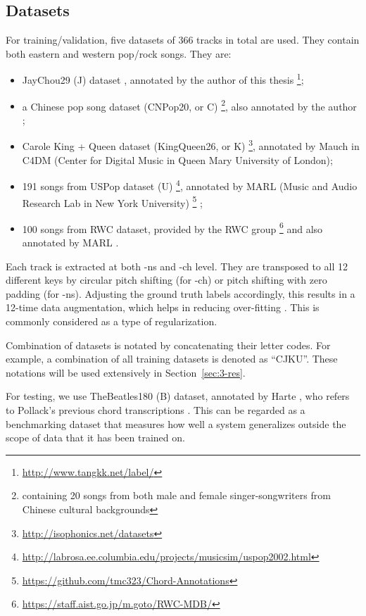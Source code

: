 \subsection{Datasets}
For training/validation, five datasets of 366 tracks in total are used. They contain both eastern and western pop/rock songs. They are:
\begin{itemize}
\item JayChou29 (J) dataset \cite{deng2016chord}, annotated by the author of this thesis \footnote{\url{http://www.tangkk.net/label/}};
\item a Chinese pop song dataset (CNPop20, or C) \footnote{containing 20 songs from both male and female singer-songwriters from Chinese cultural backgrounds}, also annotated by the author \cite{deng2016hybrid};
\item Carole King + Queen dataset (KingQueen26, or K) \footnote{\url{http://isophonics.net/datasets}}, annotated by Mauch \cite{mauch2009omras2} in C4DM (Center for Digital Music in Queen Mary University of London);
\item 191 songs from USPop dataset (U) \footnote{\url{http://labrosa.ee.columbia.edu/projects/musicsim/uspop2002.html}}, annotated by MARL (Music and Audio Research Lab in New York University) \footnote{\url{https://github.com/tmc323/Chord-Annotations}} \cite{cho2014improved};
\item 100 songs from RWC dataset, provided by the RWC group \footnote{\url{https://staff.aist.go.jp/m.goto/RWC-MDB/}} and also annotated by MARL \cite{cho2014improved}.
\end{itemize}


Each track is extracted at both -ns and -ch level. They are transposed to all 12 different keys by circular pitch shifting (for -ch) or pitch shifting with zero padding (for -ns). Adjusting the ground truth labels accordingly, this results in a 12-time data augmentation, which helps in reducing over-fitting \cite{cho2014improved,humphrey2015exploration}. This is commonly considered as a type of regularization.

Combination of datasets is notated by concatenating their letter codes. For example, a combination of all training datasets is denoted as ``CJKU''. These notations will be used extensively in Section~\ref{sec:3-res}.

For testing, we use TheBeatles180 (B) dataset, annotated by Harte \cite{harte2010towards}, who refers to Pollack's previous chord transcriptions \cite{pollack2000notes}. This can be regarded as a benchmarking dataset that measures how well a system generalizes outside the scope of data that it has been trained on.

